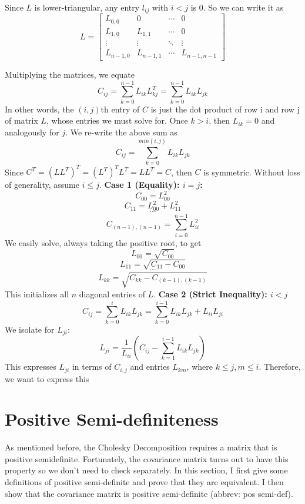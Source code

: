 \documentclass{article}
\begin{document}
Since $L$ is lower-triangular, any entry $l_{ij}$ with $i < j$ is 0. So we can write it as 
$$ L = \begin{bmatrix}
L_{0,0} & 0        & \cdots & 0 \\
L_{1,0} & L_{1,1}  & \cdots & 0 \\
\vdots  & \vdots   & \ddots & \vdots \\
L_{n-1,0} & L_{n-1,1} & \cdots & L_{n-1,n-1}
\end{bmatrix}$$

Multiplying the matrices, we equate 
$$C_{ij}  = \sum_{k = 0}^{n-1} L_{ik} L^T_{kj} = \sum_{k = 0}^{n-1} L_{ik} L_{jk} $$ 
In other words, the $(i,j)$th entry of $C$ is just the dot product of row i and row j of matrix $L$, whose entries we must solve for. Once $k > i$, then $L_{ik} = 0$ and analogously for $j$. We re-write the above sum as 
$$  C_{ij} = \sum_{k = 0}^{min(i,j)} L_{ik} L_{jk}$$
Since $C^T = (LL^T)^T = (L^T)^TL^T = LL^T = C$, then $C$ is symmetric. Without loss of generality, assume $i \leq  j$. 
\newline
\textbf{Case 1 (Equality): $ i = j$: }
$$C_{00} = L_{00}^2$$
$$C_{11} = L_{00}^2+L_{11}^2$$
$$ \cdots $$
$$C_{(n-1),(n-1)} = \sum_{i=0}^{n-1}L_{ii}^2$$
We easily solve, always taking the positive root, to get 
$$ L_{00} = \sqrt{C_{00}}$$
$$ L_{11} = \sqrt{C_{11} - C_{00}}$$
$$ \cdots $$
$$ L_{kk} = \sqrt{C_{kk} - C_{(k-1),(k-1)}}$$
This initializes all $n$ diagonal entries of $L$. 
\newline
\textbf{Case 2 (Strict Inequality): $ i < j$ }
$$ C_{ij} = \sum_{k = 0}^{i} L_{ik} L_{jk} = \sum_{k=0}^{i-1}L_{ik} L_{jk} + L_{ii}L_{ji}$$
We isolate for $L_{ji}$:  
$$ L_{ji} = \frac{1}{L_{ii}}(C_{ij} - \sum_{k=1}^{i-1}L_{ik} L_{jk})$$
This expresses $L_{ji}$ in terms of $C_{i,j}$ and entries $L_{km}$, where $k \leq j, m \leq i$. Therefore, we want to express this 
\newline

\section{Positive Semi-definiteness}
As mentioned before, the Cholesky Decomposition requires a matrix that is positive semidefinite. Fortunately, the covariance matrix turns out to have this property so we don't need to check separately. 
In this section, I first give some definitions of positive semi-definite and prove that they are equivalent. 
\newline
I then show that the covariance matrix is positive semi-definite (abbrev: pos semi-def). 
\end{document}
